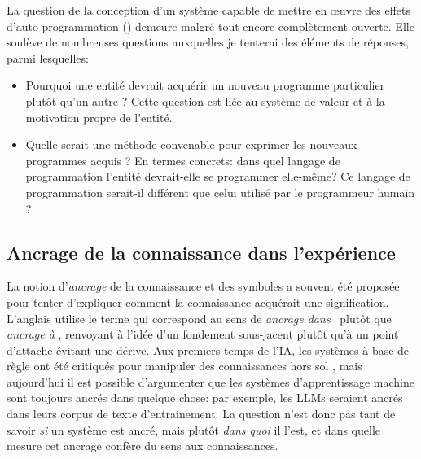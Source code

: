 La question de la conception d'un système capable de mettre en \oe uvre des effets d'auto-programmation () demeure malgré tout encore complètement ouverte. 
Elle soulève de nombreuses questions auxquelles je tenterai des éléments de réponses, parmi lesquelles: 

\begin{itemize}[label=\scalebox{.85}{$\diamond$}]
	\item Pourquoi une entité devrait acquérir un nouveau programme particulier plutôt qu'un autre ? Cette question est liée au système de valeur et à la motivation propre de l'entité.
	\item Quelle serait une méthode convenable pour exprimer les nouveaux programmes acquis ?  En termes concrets: dans quel langage de programmation l'entité devrait-elle se programmer elle-même? Ce langage de programmation serait-il différent que celui utilisé par le programmeur humain ? 

\end{itemize}




\subsection{Ancrage de la connaissance dans l'expérience}

\noindent
La notion d'\emph{ancrage} de la connaissance et des symboles a souvent été proposée pour tenter d'expliquer comment la connaissance acquérait une signification. 
L'anglais utilise le terme  qui correspond au sens de \og \emph{ancrage dans} \fg\ plutôt que \og \emph{ancrage à} \fg, 
renvoyant à l'idée d'un fondement sous-jacent plutôt qu'à un point d'attache évitant une dérive. 
Aux premiers temps de l'IA, les systèmes à base de règle ont été critiqués pour manipuler des connaissances \og hors sol \fg , mais aujourd'hui il est possible d'argumenter que les systèmes d'apprentissage machine sont toujours ancrés dans quelque chose: par exemple, les LLMs seraient ancrés dans leurs corpus de texte d'entrainement. 
La question n'est donc pas tant de savoir \emph{si} un système est ancré, mais plutôt \emph{dans quoi} il l'est, et dans quelle mesure cet ancrage confère du sens aux connaissances. 


